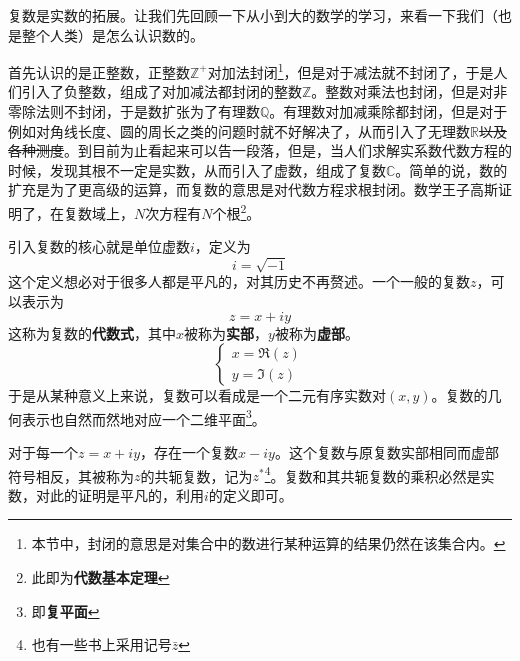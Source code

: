 \documentclass[12pt,a4paper,openany,twoside]{book}
\numberwithin{equation}{section}
\begin{document}
          复数是实数的拓展。让我们先回顾一下从小到大的数学的学习，来看一下我们（也是整个人类）是怎么认识数的。
          
          首先认识的是正整数，正整数$\mathbb{Z}^+$对加法封闭\footnote{本节中，封闭的意思是对集合中的数进行某种运算的结果仍然在该集合内。}，但是对于减法就不封闭了，于是人们引入了负整数，组成了对加减法都封闭的整数$\mathbb{Z}$。整数对乘法也封闭，但是对非零除法则不封闭，于是数扩张为了有理数$\mathbb{Q}$。有理数对加减乘除都封闭，但是对于例如对角线长度、圆的周长之类的问题时就不好解决了，从而引入了无理数$\mathbb{R}$\sout{以及各种测度}。到目前为止看起来可以告一段落，但是，当人们求解实系数代数方程的时候，发现其根不一定是实数，从而引入了虚数，组成了复数$\mathbb{C}$。简单的说，数的扩充是为了更高级的运算，而复数的意思是对代数方程求根封闭。数学王子高斯证明了，在复数域上，$N$次方程有$N$个根\footnote{此即为\textbf{代数基本定理}}。
          
          引入复数的核心就是单位虚数$i$，定义为
          \begin{equation}
            i=\sqrt{-1}
          \end{equation}
          这个定义想必对于很多人都是平凡的，对其历史不再赘述。一个一般的复数$z$，可以表示为
          \begin{equation}
            z=x+iy
          \end{equation}
          这称为复数的\textbf{代数式}，其中$x$被称为\textbf{实部}，$y$被称为\textbf{虚部}。
          \begin{equation*}
            \begin{cases}
              x=\Re(z)\\
              y=\Im(z)
            \end{cases}
          \end{equation*}
          于是从某种意义上来说，复数可以看成是一个二元有序实数对$(x,y)$。复数的几何表示也自然而然地对应一个二维平面\footnote{即\textbf{复平面}}。

          对于每一个$z=x+iy$，存在一个复数$x-iy$。这个复数与原复数实部相同而虚部符号相反，其被称为$z$的共轭复数，记为$z^*$\footnote{也有一些书上采用记号$\bar{z}$}。复数和其共轭复数的乘积必然是实数，对此的证明是平凡的，利用$i$的定义即可。
          
\end{document}

